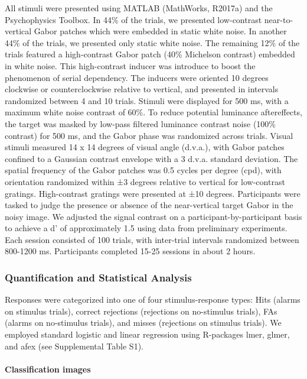 \documentclass[
]{article}
\begin{document}
All stimuli were presented using MATLAB (MathWorks, R2017a) and the
Psychophysics Toolbox. In 44\% of the trials, we presented low-contrast
near-to-vertical Gabor patches which were embedded in static white
noise. In another 44\% of the trials, we presented only static white
noise. The remaining 12\% of the trials featured a high-contrast Gabor
patch (40\% Michelson contrast) embedded in white noise. This
high-contrast inducer was introduce to boost the phenomenon of serial
dependency. The inducers were oriented 10 degrees clockwise or
counterclockwise relative to vertical, and presented in intervals
randomized between 4 and 10 trials. Stimuli were displayed for 500 ms,
with a maximum white noise contrast of 60\%. To reduce potential
luminance aftereffects, the target was masked by low-pass filtered
luminance contrast noise (100\% contrast) for 500 ms, and the Gabor
phase was randomized across trials. Visual stimuli measured 14 x 14
degrees of visual angle (d.v.a.), with Gabor patches confined to a
Gaussian contrast envelope with a 3 d.v.a. standard deviation. The
spatial frequency of the Gabor patches was 0.5 cycles per degree (cpd),
with orientation randomized within ±3 degrees relative to vertical for
low-contrast gratings. High-contrast gratings were presented at ±10
degrees. Participants were tasked to judge the presence or absence of
the near-vertical target Gabor in the noisy image. We adjusted the
signal contrast on a participant-by-participant basis to achieve a d' of
approximately 1.5 using data from preliminary experiments. Each session
consisted of 100 trials, with inter-trial intervals randomized between
800-1200 ms. Participants completed 15-25 sessions in about 2 hours.

\hypertarget{quantification-and-statistical-analysis}{%
\subsubsection{Quantification and Statistical
Analysis}\label{quantification-and-statistical-analysis}}

Responses were categorized into one of four stimulus-response types:
Hits (alarms on stimulus trials), correct rejections (rejections on
no-stimulus trials), FAs (alarms on no-stimulus trials), and misses
(rejections on stimulus trials). We employed standard logistic and
linear regression using R-packages lmer, glmer, and afex (see
Supplemental Table S1).

\hypertarget{classification-images}{%
\paragraph{Classification images}\label{classification-images}}
\end{document}
